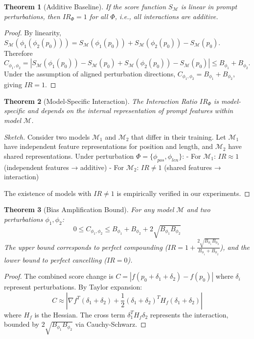 \documentclass[11pt]{article}
\newtheorem{theorem}{Theorem}
\newtheorem{proof}{Proof}
\begin{document}
\begin{theorem}[Additive Baseline]
If the score function $S_\mathcal{M}$ is linear in prompt perturbations, then $IR_\Phi = 1$ for all $\Phi$, i.e., all interactions are additive.
\end{theorem}

\begin{proof}
By linearity, $S_\mathcal{M}(\phi_1(\phi_2(p_0))) = S_\mathcal{M}(\phi_1(p_0)) + S_\mathcal{M}(\phi_2(p_0)) - S_\mathcal{M}(p_0)$. Therefore $C_{\phi_1,\phi_2} = |S_\mathcal{M}(\phi_1(p_0)) - S_\mathcal{M}(p_0) + S_\mathcal{M}(\phi_2(p_0)) - S_\mathcal{M}(p_0)| \leq B_{\phi_1} + B_{\phi_2}$. Under the assumption of aligned perturbation directions, $C_{\phi_1,\phi_2} = B_{\phi_1} + B_{\phi_2}$, giving $IR = 1$.
\end{proof}

\begin{theorem}[Model-Specific Interaction]
The Interaction Ratio $IR_\Phi$ is model-specific and depends on the internal representation of prompt features within model $\mathcal{M}$.
\end{theorem}

\begin{proof}[Sketch]
Consider two models $\mathcal{M}_1$ and $\mathcal{M}_2$ that differ in their training. Let $\mathcal{M}_1$ have independent feature representations for position and length, and $\mathcal{M}_2$ have shared representations. Under perturbation $\Phi = \{\phi_{pos}, \phi_{len}\}$:
- For $\mathcal{M}_1$: $IR \approx 1$ (independent features → additive)
- For $\mathcal{M}_2$: $IR \neq 1$ (shared features → interaction)

The existence of models with $IR \neq 1$ is empirically verified in our experiments.
\end{proof}

\begin{theorem}[Bias Amplification Bound]
For any model $\mathcal{M}$ and two perturbations $\phi_1, \phi_2$:
\begin{equation}
0 \leq C_{\phi_1,\phi_2} \leq B_{\phi_1} + B_{\phi_2} + 2\sqrt{B_{\phi_1}B_{\phi_2}}
\end{equation}
The upper bound corresponds to perfect compounding ($IR = 1 + \frac{2\sqrt{B_{\phi_1}B_{\phi_2}}}{B_{\phi_1}+B_{\phi_2}}$), and the lower bound to perfect cancelling ($IR = 0$).
\end{theorem}

\begin{proof}
The combined score change is $C = |f(p_0 + \delta_1 + \delta_2) - f(p_0)|$ where $\delta_i$ represent perturbations. By Taylor expansion:
\begin{equation}
C \approx |\nabla f^T(\delta_1+\delta_2) + \frac{1}{2}(\delta_1+\delta_2)^T H_f (\delta_1+\delta_2)|
\end{equation}
where $H_f$ is the Hessian. The cross term $\delta_1^T H_f \delta_2$ represents the interaction, bounded by $2\sqrt{B_{\phi_1}B_{\phi_2}}$ via Cauchy-Schwarz.
\end{proof}
\end{document}
